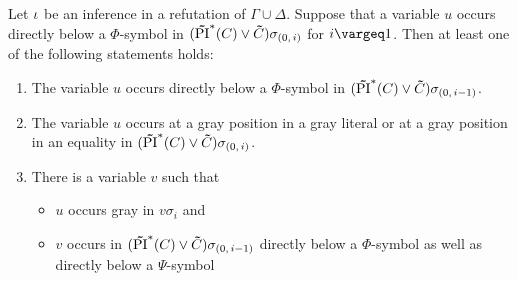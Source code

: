 \documentclass[%
	draft=false,%
	numbers=noendperiod,%
	11pt,%
	a4paper,%
	oneside,%
	openany,%
]{memoir}
\begin{document}
\begin{lemma}
	\label{lemma:var_below_phi_symbol}
	Let $\iota$ be an inference in a refutation of $\Gamma\cup\Delta$.
	Suppose that a variable $u$ occurs directly below a $\Phi$-symbol in $(\bm\tilde{\operatorname{PI}}^{*}(C)\lor \bm\tilde{C})\sigma_{(0,\,i)}$ for $i\vargeq 1$.
	Then at least one of the following statements holds:
	\begin{enumerate}
		\item
			\label{14_1}
			\label{15_1}
			The variable $u$ occurs directly below a $\Phi$-symbol in $(\bm\tilde{\operatorname{PI}}^{*}(C)\lor \bm\tilde{C})\sigma_{(0,\,i-1)}$.

		\item
			\label{14_5}
			\label{15_5}
			The variable $u$ occurs at a gray position in a gray literal or at a gray position in an equality in $(\bm\tilde{\operatorname{PI}}^{*}(C)\lor \bm\tilde{C})\sigma_{(0,\,i)}$.

		\item 
			\label{14_2}
			\label{15_2}
			There is a variable $v$ such that 
			{
				\renewcommand{\labelitemi}{\textendash}
				\begin{itemize}
					\item $u$ occurs gray in $v\sigma_i$ and
					\item $v$ occurs in $(\bm\tilde{\operatorname{PI}}^{*}(C)\lor \bm\tilde{C})\sigma_{(0,\,i-1)}$ directly below a $\Phi$-symbol as well as directly below a $\Psi$-symbol
				\end{itemize}
			}

	\end{enumerate}
\end{lemma}
\end{document}
